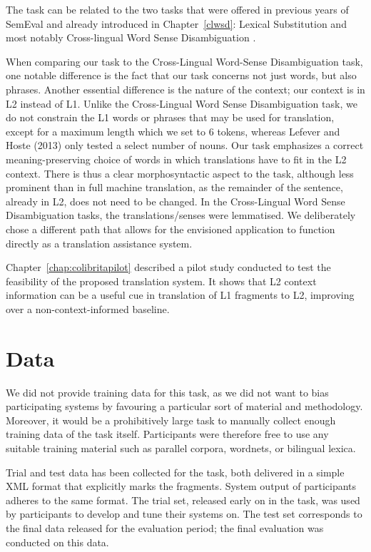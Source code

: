 The task can be related to the two tasks that were offered in previous years of
SemEval and already introduced in Chapter~\ref{clwsd}: Lexical Substitution
\citep{CLLS} and most notably Cross-lingual Word Sense Disambiguation
\citep{Lefever2013}.

When comparing our task to the Cross-Lingual Word-Sense Disambiguation task,
one notable difference is the fact that our task concerns not just words, but
also phrases. Another essential difference is the nature of the context; our
context is in L2 instead of L1. Unlike the Cross-Lingual Word Sense
Disambiguation task, we do not constrain the L1 words or phrases that may be
used for translation, except for a maximum length which we set to 6 tokens,
whereas Lefever and Hoste (2013) only tested a select number of nouns. Our task
emphasizes a correct meaning-preserving choice of words in which translations
have to fit in the L2 context. There is thus a clear morphosyntactic aspect to
the task, although less prominent than in full machine translation, as the
remainder of the sentence, already in L2, does not need to be changed.  In the
Cross-Lingual Word Sense Disambiguation tasks, the translations/senses were
lemmatised. We deliberately chose a different path that allows for the
envisioned application to function directly as a translation assistance system.

Chapter~\ref{chap:colibritapilot} described a pilot study conducted to test the
feasibility of the proposed translation system. It shows that L2 context
information can be a useful cue in translation of L1 fragments to L2, improving
over a non-context-informed baseline.


\section{Data}
\label{sec:data}

We did not provide training data for this task, as we did not want to bias
participating systems by favouring a particular sort of material and
methodology. Moreover, it would be a prohibitively large task to manually
collect enough training data of the task itself. Participants were therefore
free to use any suitable training material such as parallel corpora, wordnets,
or bilingual lexica.

Trial and test data has been collected for the task, both delivered in a simple
XML format that explicitly marks the fragments. System output of participants
adheres to the same format. The trial set, released early on in the task, was
used by participants to develop and tune their systems on. The test set
corresponds to the final data released for the evaluation period; the final
evaluation was conducted on this data.

